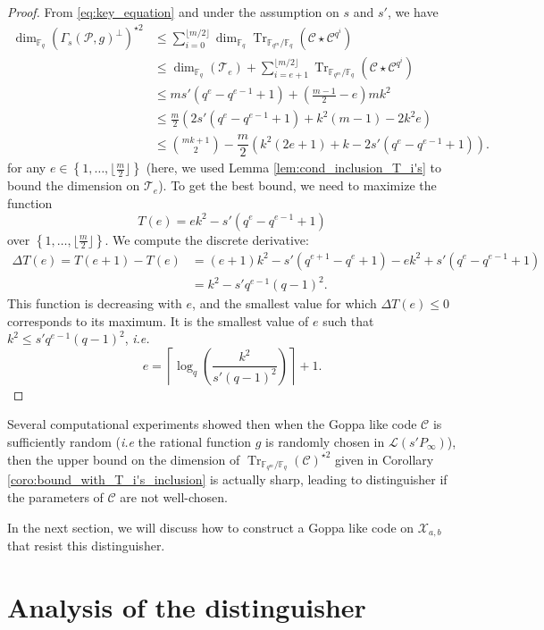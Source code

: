 \documentclass[a4paper]{article}
\theoremstyle{definition}
\theoremstyle{remark}
\newcommand{\calP}{\mathcal{P}}
\newcommand{\calL}{\mathcal{L}}
\newcommand{\calC}{\mathcal{C}}
\newcommand{\calT}{\mathcal{T}}
\newcommand{\calX}{\mathcal{X}}
\newcommand{\fq}{\mathbb{F}_{q}}
\newcommand{\Tr}[1]{\operatorname{Tr}_{\mathbb{F}_{q^m}/\fq}\left(#1\right)}
\newcommand{\set}[1]{\left\{#1\right\}}
\begin{document}
\begin{proof}
    From \eqref{eq:key_equation} and under the assumption on $s$ and $s'$, we have
        \begin{align*}
        \dim_{\fq} (\Gamma_s(\calP,g)^{\perp})^{\star 2}
        & \leq \sum\limits_{i=0}^{\lfloor m/2 \rfloor} \dim_{\fq} \Tr{\calC \star \calC^{q^i}} \\
        & \leq \dim_{\fq} (\calT_e) + \sum\limits_{i=e+1}^{\lfloor m/2 \rfloor} \Tr{\calC \star \calC^{q^i}} \\
        & \leq ms'(q^e-q^{e-1}+1) + \left( \frac{m-1}{2} -e \right)mk^2 \\
        & \leq \frac{m}{2}\left(2s'(q^e-q^{e-1}+1)+k^2(m-1)-2k^2e  \right) \\
        & \leq \binom{mk+1}{2} -  \dfrac{m}{2}\left(k^2(2e+1)+k-2s'(q^e-q^{e-1}+1)\right).
    \end{align*}
for any $e \in \set{1,\dots,\lfloor \frac{m}{2} \rfloor}$ (here, we used Lemma \ref{lem:cond_inclusion_T_i's} to bound the dimension on $\calT_e$).
To get the best bound, we need to maximize the function
$$T(e) = ek^2-s'(q^e-q^{e-1}+1)$$
over $\set{1,\dots,\lfloor \frac{m}{2} \rfloor}$.
We compute the discrete derivative:
\begin{align*}
    \Delta T(e) = T(e+1)-T(e) &= (e+1)k^2- s'(q^{e+1}-q^e+1) - ek^2 + s'(q^e-q^{e-1}+1) \\
                              &= k^2 - s'q^{e-1}(q-1)^2.
\end{align*}
This function is decreasing with $e$, and the smallest value for which $\Delta T(e) \leq 0$ corresponds to its maximum. It is the smallest value of $e$ such that $k^2 \leq s'q^{e-1}(q-1)^2$, \emph{i.e.}
$$e =  \left\lceil \log_q\left(\dfrac{k^2}{s'(q-1)^2}\right)\right\rceil+1.$$
\end{proof}

\noindent Several computational experiments showed then when the Goppa like code $\calC$ is sufficiently random (\emph{i.e} the rational function $g$ is randomly chosen in $\calL(s'P_\infty)$), then the upper bound on the dimension of $\Tr{\calC}^{\star 2}$ given in Corollary \ref{coro:bound_with_T_i's_inclusion} is actually sharp, leading to  distinguisher if the parameters of $\calC$ are not well-chosen. 

In the next section, we will discuss how to construct a Goppa like code on $\calX_{a,b}$ that resist this distinguisher.

\section{Analysis of the distinguisher}
\end{document}

